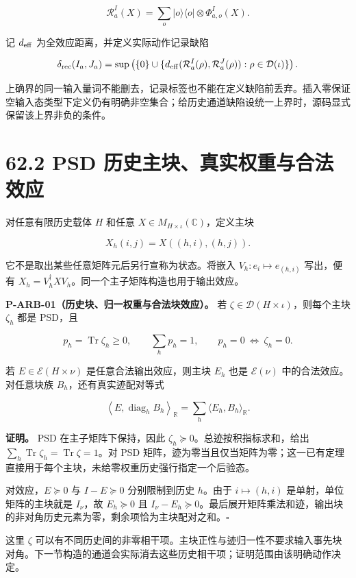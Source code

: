 \documentclass[
  11pt,
  oneside]{book}
\begin{document}
\[
\mathcal R^I_a(X)=\sum_o|o\rangle\langle o|\otimes\Phi^I_{a,o}(X).
\]

记 \(d_{\rm eff}\) 为全效应距离，并定义实际动作记录缺陷

\[
\delta_{\rm rec}(I_a,J_a)
=\sup\left(\{0\}\cup
 \{d_{\rm eff}(\mathcal R^I_a(\rho),\mathcal R^J_a(\rho)):
   \rho\in\mathcal D(\iota)\}\right).
\]

上确界的同一输入量词不能删去，记录标签也不能在定义缺陷前丢弃。插入零保证空输入态类型下定义仍有明确非空集合；给历史通道缺陷设统一上界时，源码显式保留该上界非负的条件。

\section{62.2 PSD 历史主块、真实权重与合法效应}

对任意有限历史载体 \(H\) 和任意
\(X\in M_{H\times\iota}(\mathbb C)\)，定义主块

\[
X_h(i,j)=X((h,i),(h,j)).
\]

它不是取出某些任意矩阵元后另行宣称为状态。将嵌入
\(V_h:e_i\mapsto e_{(h,i)}\) 写出，便有
\(X_h=V_h^\dagger XV_h\)。同一个主子矩阵构造也用于输出效应。

\protect\hypertarget{p-arb-01}{}{}

\textbf{P-ARB-01（历史块、归一权重与合法块效应）。} 若
\(\zeta\in\mathcal D(H\times\iota)\)，则每个主块 \(\zeta_h\) 都是
PSD，且

\[
p_h=\operatorname{Tr}\zeta_h\ge0,
\qquad \sum_h p_h=1,
\qquad p_h=0\ \Longleftrightarrow\ \zeta_h=0.
\]

若 \(E\in\mathcal E(H\times\nu)\) 是任意合法输出效应，则主块 \(E_h\)
也是 \(\mathcal E(\nu)\) 中的合法效应。对任意块族
\(B_h\)，还有真实迹配对等式

\[
\left\langle E,\operatorname{diag}_hB_h\right\rangle_{\mathbb R}
=\sum_h\langle E_h,B_h\rangle_{\mathbb R}.
\]

\textbf{证明。} PSD 在主子矩阵下保持，因此
\(\zeta_h\succeq0\)。总迹按积指标求和，给出
\(\sum_h\operatorname{Tr}\zeta_h=\operatorname{Tr}\zeta=1\)。对 PSD
矩阵，迹为零当且仅当矩阵为零；这一已有定理直接用于每个主块，未给零权重历史强行指定一个后验态。

对效应，\(E\succeq0\) 与 \(I-E\succeq0\) 分别限制到历史 \(h\)。由于
\(i\mapsto(h,i)\) 是单射，单位矩阵的主块就是 \(I_\nu\)，故
\(E_h\succeq0\) 且
\(I_\nu-E_h\succeq0\)。最后展开矩阵乘法和迹，输出块的非对角历史元素为零，剩余项恰为主块配对之和。\(\square\)

这里 \(\zeta\)
可以有不同历史间的非零相干项。主块正性与迹归一性不要求输入事先块对角。下一节构造的通道会实际消去这些历史相干项；证明范围由该明确动作决定。
\end{document}
